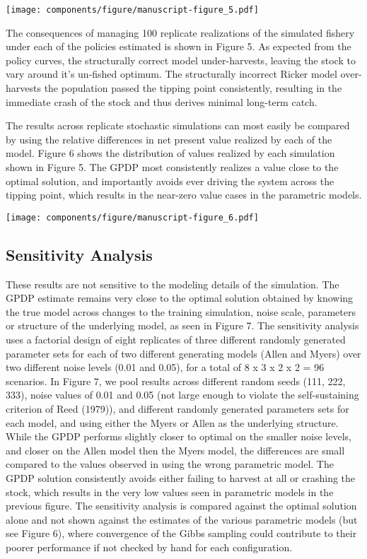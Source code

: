 \documentclass[]{components/elsarticle}
\begin{document}
\texttt{[image: components/figure/manuscript-figure\_5.pdf]}

The consequences of managing 100 replicate realizations of the simulated
fishery under each of the policies estimated is shown in Figure 5. As
expected from the policy curves, the structurally correct model
under-harvests, leaving the stock to vary around it's un-fished optimum.
The structurally incorrect Ricker model over-harvests the population
passed the tipping point consistently, resulting in the immediate crash
of the stock and thus derives minimal long-term catch.

The results across replicate stochastic simulations can most easily be
compared by using the relative differences in net present value realized
by each of the model. Figure 6 shows the distribution of values realized
by each simulation shown in Figure 5. The GPDP most consistently
realizes a value close to the optimal solution, and importantly avoids
ever driving the system across the tipping point, which results in the
near-zero value cases in the parametric models.

\texttt{[image: components/figure/manuscript-figure\_6.pdf]}

\subsection{Sensitivity Analysis}\label{sensitivity-analysis}

These results are not sensitive to the modeling details of the
simulation. The GPDP estimate remains very close to the optimal solution
obtained by knowing the true model across changes to the training
simulation, noise scale, parameters or structure of the underlying
model, as seen in Figure 7. The sensitivity analysis uses a factorial
design of eight replicates of three different randomly generated
parameter sets for each of two different generating models (Allen and
Myers) over two different noise levels (0.01 and 0.05), for a total of 8
x 3 x 2 x 2 = 96 scenarios. In Figure 7, we pool results across
different random seeds (111, 222, 333), noise values of 0.01 and 0.05
(not large enough to violate the self-sustaining criterion of Reed
(1979)), and different randomly generated parameters sets for each
model, and using either the Myers or Allen as the underlying structure.
While the GPDP performs slightly closer to optimal on the smaller noise
levels, and closer on the Allen model then the Myers model, the
differences are small compared to the values observed in using the wrong
parametric model. The GPDP solution consistently avoids either failing
to harvest at all or crashing the stock, which results in the very low
values seen in parametric models in the previous figure. The sensitivity
analysis is compared against the optimal solution alone and not shown
against the estimates of the various parametric models (but see Figure
6), where convergence of the Gibbs sampling could contribute to their
poorer performance if not checked by hand for each configuration.
\end{document}
